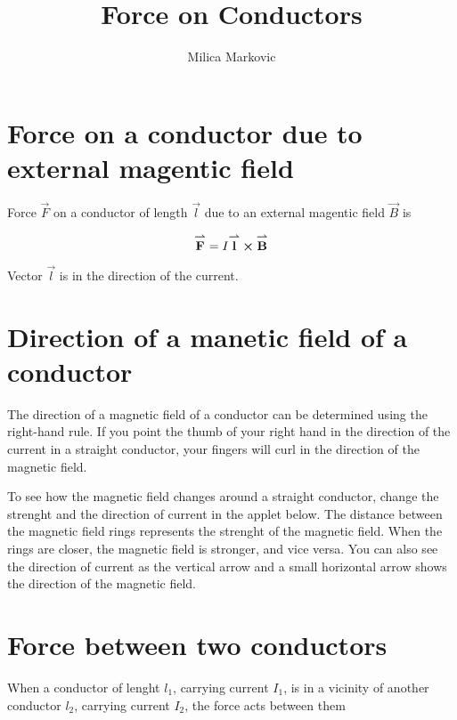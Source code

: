 \documentclass{ximera}
\title{Force on Conductors}
\author{Milica Markovic}
\begin{document}
  
\begin{abstract}  

\end{abstract}  
\maketitle    



\section{Force on a conductor due to external magentic field}


Force $\vec{F}$ on a conductor of length $\vec{l}$ due to an external magentic field $\vec{B}$ is

\begin{equation}
{\overset{\boldsymbol{\rightharpoonup}}{\mathbf{F}}}\hspace{0in}=I {\overset{\boldsymbol{\rightharpoonup}}{\mathbf{l}}}\hspace{0in} \boldsymbol\times {\overset{\boldsymbol{\rightharpoonup}}{\mathbf{B}}}\hspace{0in}
\end{equation}

Vector $\vec{l}$ is in the direction of the current.


\section{Direction of a manetic field of a conductor}

The direction of a magnetic field of a conductor can be determined using the right-hand rule. If you point the thumb of your right hand in the direction of the current in a straight conductor, your fingers will curl in the direction of the magnetic field.

 To see how the magnetic field changes around a straight conductor, change the strenght and the direction of current in the applet below. The distance between the magnetic field rings represents the strenght of the magnetic field. When the rings are closer, the magnetic field is stronger, and vice versa. You can also see the direction of current as the vertical arrow and a small horizontal arrow shows the direction of the magnetic field. 


\begin{center}  
\end{center} 


\section{Force between two conductors}

When a conductor of lenght $l_1$, carrying current $I_1$, is in a vicinity of another conductor $l_2$, carrying current $I_2$, the force acts between them 
\end{document}
